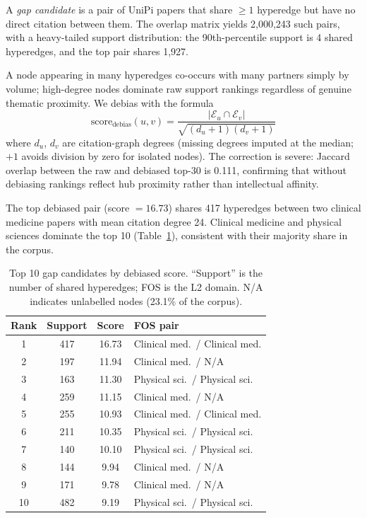 A \emph{gap candidate} is a pair of UniPi papers that share $\geq 1$ hyperedge but have no direct citation between them. The overlap matrix yields 2,000,243 such pairs, with a heavy-tailed support distribution: the 90th-percentile support is 4 shared hyperedges, and the top pair shares 1,927.

A node appearing in many hyperedges co-occurs with many partners simply by volume; high-degree nodes dominate raw support rankings regardless of genuine thematic proximity. We debias with the formula
\begin{equation}\label{eq:debias}
  \text{score}_{\text{debias}}(u,v)
  = \frac{|\mathcal{E}_u \cap \mathcal{E}_v|}
         {\sqrt{(d_u + 1)(d_v + 1)}}
\end{equation}
where $d_u$, $d_v$ are citation-graph degrees (missing degrees imputed at the median; $+1$ avoids division by zero for isolated nodes). The correction is severe: Jaccard overlap between the raw and debiased top-30 is 0.111, confirming that without debiasing rankings reflect hub proximity rather than intellectual affinity.

The top debiased pair (score $= 16.73$) shares 417 hyperedges between two clinical medicine papers with mean citation degree 24. Clinical medicine and physical sciences dominate the top 10 (Table~\ref{tab:top-gaps}), consistent with their majority share in the corpus.

\begin{table}[t]
  \centering
  \footnotesize

  \begin{tabular}{cccl}
    \toprule
    Rank & Support & Score & FOS pair \\
    \midrule
     1 &  417 & 16.73 & Clinical med.\ / Clinical med. \\
     2 &  197 & 11.94 & Clinical med.\ / N/A \\
     3 &  163 & 11.30 & Physical sci.\ / Physical sci. \\
     4 &  259 & 11.15 & Clinical med.\ / N/A \\
     5 &  255 & 10.93 & Clinical med.\ / Clinical med. \\
     6 &  211 & 10.35 & Physical sci.\ / Physical sci. \\
     7 &  140 & 10.10 & Physical sci.\ / Physical sci. \\
     8 &  144 &  9.94 & Clinical med.\ / N/A \\
     9 &  171 &  9.78 & Clinical med.\ / N/A \\
    10 &  482 &  9.19 & Physical sci.\ / Physical sci. \\
    \bottomrule
  \end{tabular}
    \caption{Top 10 gap candidates by debiased score. ``Support'' is the number of shared hyperedges; FOS is the L2 domain. N/A indicates unlabelled nodes (23.1\% of the corpus).}
  \label{tab:top-gaps}
\end{table}

